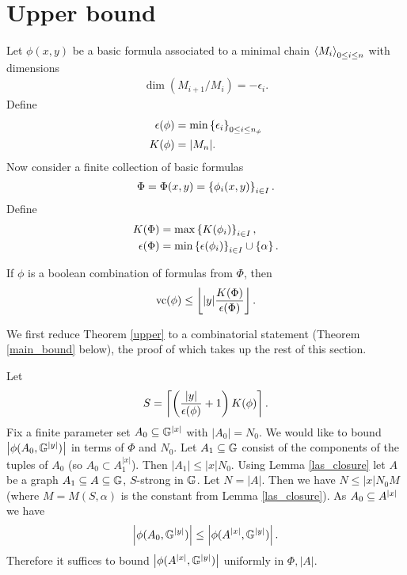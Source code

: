 \section{Upper bound}
Let $\phi(x,y)$ be a basic formula associated to a minimal chain  $\left\langle M_i \right\rangle_{0 \leq i \leq n}$ with dimensions
\begin{align*}
  \dim(M_{i+1}/M_i) = -\epsilon_i.  
\end{align*}
Define
\begin{align*}
  \epsilon(\phi) &= \min \left\{\epsilon_i\right\}_{0 \leq i \leq n_\phi}\\
  K(\phi) &= |M_{n}|.
\end{align*}
Now consider a finite collection of basic formulas
\begin{align*}
  \Phi = \Phi( x, y) = \left\{\phi_i( x,  y)\right\}_{i\in I}.
\end{align*}
Define
\begin{align*}
  K(\Phi) &= \max \left\{K(\phi_i)\right\}_{i \in I}, \\
  \epsilon(\Phi) &= \min \left\{\epsilon(\phi_i)\right\}_{i \in I} \cup \left\{\alpha\right\}.
\end{align*}
\begin{Theorem} \label{upper}
  If $\phi$ is a boolean combination of formulas from $\Phi$, then
  \begin{align*}
    \operatorname{vc}(\phi) \leq \left \lfloor |y|\frac{K(\Phi)}{\epsilon(\Phi)} \right \rfloor.    
  \end{align*}
\end{Theorem}
We first reduce Theorem \ref{upper} to a combinatorial statement (Theorem \ref{main_bound} below), the proof of which
takes up the rest of this section.

Let
\begin{align*}
  S = \left\lceil{\left(\frac{|y|}{\epsilon(\phi)} + 1\right) K(\phi)}\right\rceil.
\end{align*}
Fix a finite parameter set $A_0 \subseteq \mathbb G^{|x|}$ with $|A_0| = N_0$.
We would like to bound $\left|\phi(A_0, \mathbb G^{|y|})\right|$ in terms of $\Phi$ and $N_0$.
Let $A_1 \subseteq \mathbb G$ consist of the components of the tuples of $A_0$ (so $A_0 \subset A_1^{|x|}$).
Then $|A_1| \leq |x| N_0$.
Using Lemma \ref{las_closure} let $A$ be a graph $A_1 \subseteq A \subseteq \mathbb G$, $S$-strong in $\mathbb G$.
Let $N = |A|$.
Then we have $N \leq |x| N_0 M$ (where $M = M(S, \alpha)$ is the constant from Lemma \ref{las_closure}).
As $A_0 \subseteq A^{|x|}$ we have
\begin{align*}
  \left|\phi(A_0, \mathbb G^{|y|})\right| \leq \left|\phi(A^{|x|}, \mathbb G^{|y|})\right|.
\end{align*}
Therefore it suffices to bound $\left|\phi(A^{|x|}, \mathbb G^{|y|})\right|$ uniformly in $\Phi, |A|$.

